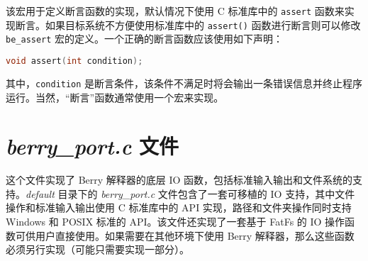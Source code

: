 
该宏用于定义断言函数的实现，默认情况下使用 C 标准库中的 \texttt{assert} 函数来实现断言。如果目标系统不方便使用标准库中的 \texttt{assert()} 函数进行断言则可以修改 \texttt{be\_assert} 宏的定义。一个正确的断言函数应该使用如下声明：

\begin{lstlisting}[language=c, numbers=none]
void assert(int condition);
\end{lstlisting}

其中，\texttt{condition} 是断言条件，该条件不满足时将会输出一条错误信息并终止程序运行。当然，“断言”函数通常使用一个宏来实现。

\section{\textsl{berry\_port.c} 文件}

这个文件实现了 Berry 解释器的底层 IO 函数，包括标准输入输出和文件系统的支持。\textsl{default} 目录下的 \textsl{berry\_port.c} 文件包含了一套可移植的 IO 支持，其中文件操作和标准输入输出使用 C 标准库中的 API 实现，路径和文件夹操作同时支持 Windows 和 POSIX 标准的 API。该文件还实现了一套基于 FatFs 的 IO 操作函数可供用户直接使用。如果需要在其他环境下使用 Berry 解释器，那么这些函数必须另行实现（可能只需要实现一部分）。
